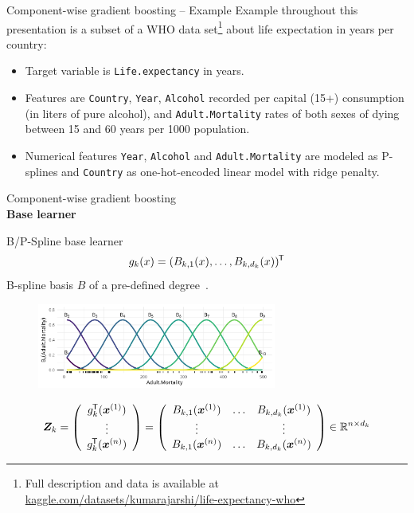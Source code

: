 \documentclass[t,10pt]{beamer}
\newcommand{\fSlide}[2]{
\begin{frame}[plain]{}%
  \vspace{4cm}%
  \Large #1\\[0.2cm]%
  {\LARGE\textbf{#2}}%
	\addtocounter{framenumber}{-1}%
\end{frame}%
}
\begin{document}
\begin{frame}{Component-wise gradient boosting – Example}
  Example throughout this presentation is a subset of a WHO data set\footnote[frame,1]{Full description and data is available at \url{kaggle.com/datasets/kumarajarshi/life-expectancy-who}} about life expectation in years per country:

  \begin{itemize}
    \item
      Target variable is \texttt{Life.expectancy} in years.
    \item
      Features are \texttt{Country}, \texttt{Year}, \texttt{Alcohol} recorded per capital (15+) consumption (in liters of pure alcohol), and \texttt{Adult.Mortality} rates of both sexes of dying between 15 and 60 years per 1000 population.

    \item
      Numerical features \texttt{Year}, \texttt{Alcohol} and \texttt{Adult.Mortality} are modeled as P-splines \citep{eilers1996flexible} and \texttt{Country} as one-hot-encoded linear model with ridge penalty.

  \end{itemize}
\end{frame}

\fSlide{Component-wise gradient boosting}{Base learner}

\begin{frame}{B/P-Spline base learner}
  \vspace{-0.3cm}\[g_k(x) = (B_{k,1}(x), \dots, B_{k,d_k}(x))^\tran\] B-spline basis $B$ of a pre-defined degree~\citep{eilers1996flexible}.
  \begin{center}
    \begin{figure}
      \includegraphics[width=0.7\textwidth]{figures/bs-base/fig-bs0.png}
    \end{figure}
    \vspace{-0.3cm}
    \[
    \design_k = \left(\begin{array}{c}
      g_{k}^\tran(\xi[1]) \\
      \vdots \\
      g_{k}^\tran(\xi[n])
    \end{array}\right) = \left(\begin{array}{ccc}
      B_{k,1}(\xi[1]) & \dots & B_{k,d_k}(\xi[1]) \\
      \vdots &  & \vdots \\
      B_{k,1}(\xi[n]) & \dots & B_{k,d_k}(\xi[n])
    \end{array}\right)\in\R^{n\times d_k}
    \]
  \end{center}

\end{frame}
\end{document}

